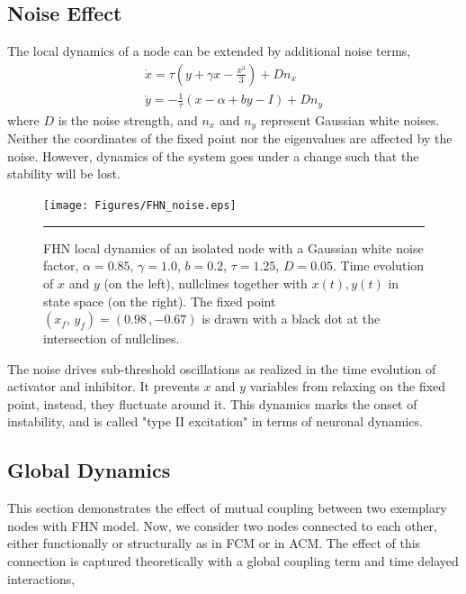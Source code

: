\subsection{Noise Effect}

The local dynamics of a node can be extended by  additional noise terms, 
\begin{subequations}
\begin{align}\dot{x} = \tau (y + \gamma x - \frac{x^3}{3}) + Dn_x  \label{eqn: frobenius 12}\\  \dot{y} = -\frac{1}{\tau} (x - \alpha + b y - I ) + Dn_y \label{eqn: frobenius 13}   \end{align} 
\end{subequations}
where $D$ is the noise strength, and $n_x$ and $n_y$ represent Gaussian white noises. Neither the coordinates of the fixed point nor the eigenvalues are affected by the noise. However, dynamics of the system goes under a change such that the stability will be lost. 

\begin{figure}[htbp]
  \centering
	\texttt{[image: Figures/FHN\_noise.eps]}
 
    \rule{35em}{0.5pt}
    \caption[FHN Noise]{FHN local dynamics of an isolated node with a Gaussian white noise factor, $\alpha=0.85$, $\gamma=1.0$, $b=0.2$, $\tau=1.25$, $D=0.05$. Time evolution of $x$ and  $y$ (on the left), nullclines together with $x(t),y(t)$ in state space (on the right). The fixed point $(x_f, \, y_f) = (0.98 \, , -0.67 )$ is drawn with a black dot at the intersection of nullclines.  }
  \label{fig:FHN Noise}	
\end{figure}

The noise drives sub-threshold oscillations as realized in the time evolution of activator and inhibitor. It prevents $x$ and $y$ variables from relaxing on the fixed point, instead, they fluctuate around it. This dynamics marks the onset of instability, and is called "type II excitation" in terms of neuronal dynamics. 


\subsection{Global Dynamics}

This section demonstrates the effect of mutual coupling between two exemplary nodes with FHN model. Now, we consider two nodes connected to each other, either functionally or structurally as in FCM or in ACM. The effect of this connection is captured theoretically with a global coupling term and time delayed interactions, 

